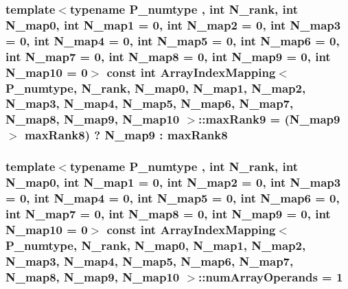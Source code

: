 \subsubsection[{max\+Rank9}]{\setlength{\rightskip}{0pt plus 5cm}template$<$typename P\+\_\+numtype , int N\+\_\+rank, int N\+\_\+map0, int N\+\_\+map1 = 0, int N\+\_\+map2 = 0, int N\+\_\+map3 = 0, int N\+\_\+map4 = 0, int N\+\_\+map5 = 0, int N\+\_\+map6 = 0, int N\+\_\+map7 = 0, int N\+\_\+map8 = 0, int N\+\_\+map9 = 0, int N\+\_\+map10 = 0$>$ const int {\bf Array\+Index\+Mapping}$<$ P\+\_\+numtype, N\+\_\+rank, N\+\_\+map0, N\+\_\+map1, N\+\_\+map2, N\+\_\+map3, N\+\_\+map4, N\+\_\+map5, N\+\_\+map6, N\+\_\+map7, N\+\_\+map8, N\+\_\+map9, N\+\_\+map10 $>$\+::max\+Rank9 = (N\+\_\+map9 $>$ {\bf max\+Rank8}) ? N\+\_\+map9 \+: {\bf max\+Rank8}\hspace{0.3cm}{\ttfamily [static]}}\label{classArrayIndexMapping_a8cfa29ef71a3141bec2f5a4463b80286}
\hypertarget{classArrayIndexMapping_a0451e1373499ecee96a4f960927f1682}{}
\subsubsection[{num\+Array\+Operands}]{\setlength{\rightskip}{0pt plus 5cm}template$<$typename P\+\_\+numtype , int N\+\_\+rank, int N\+\_\+map0, int N\+\_\+map1 = 0, int N\+\_\+map2 = 0, int N\+\_\+map3 = 0, int N\+\_\+map4 = 0, int N\+\_\+map5 = 0, int N\+\_\+map6 = 0, int N\+\_\+map7 = 0, int N\+\_\+map8 = 0, int N\+\_\+map9 = 0, int N\+\_\+map10 = 0$>$ const int {\bf Array\+Index\+Mapping}$<$ P\+\_\+numtype, N\+\_\+rank, N\+\_\+map0, N\+\_\+map1, N\+\_\+map2, N\+\_\+map3, N\+\_\+map4, N\+\_\+map5, N\+\_\+map6, N\+\_\+map7, N\+\_\+map8, N\+\_\+map9, N\+\_\+map10 $>$\+::num\+Array\+Operands = 1\hspace{0.3cm}{\ttfamily [static]}}\label{classArrayIndexMapping_a0451e1373499ecee96a4f960927f1682}
\hypertarget{classArrayIndexMapping_a6e2238603bb36c0af24dcbced06e7500}{}
